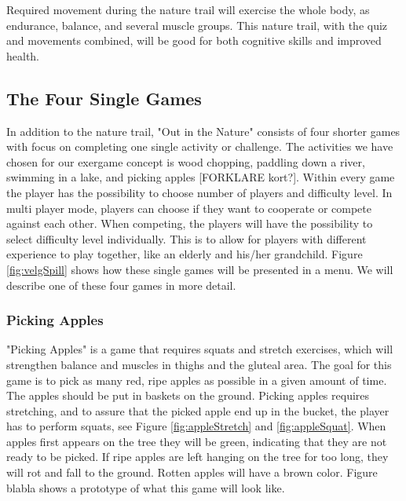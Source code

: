 Required movement during the nature trail will exercise the whole body, as endurance, balance, and several muscle groups. This nature trail, with the quiz and movements combined, will be good for both cognitive skills and improved health.       

\subsection{The Four Single Games}
In addition to the nature trail, "Out in the Nature" consists of four shorter games with focus on completing one single activity or challenge. The activities we have chosen for our exergame concept is wood chopping, paddling down a river, swimming in a lake, and picking apples [FORKLARE kort?]. Within every game the player has the possibility to choose number of players and difficulty level. In multi player mode, players can choose if they want to cooperate or compete against each other. When competing, the players will have the possibility to select difficulty level individually. This is to allow for players with different experience to play together, like an elderly and his/her grandchild. Figure \ref{fig:velgSpill} shows how these single games will be presented in a menu. We will describe one of these four games in more detail.

\subsubsection{Picking Apples}
"Picking Apples" is a game that requires squats and stretch exercises, which will strengthen balance and muscles in thighs and the gluteal area. The goal for this game is to pick as many red, ripe apples as possible in a given amount of time. The apples should be put in baskets on the ground. Picking apples requires stretching, and to assure that the picked apple end up in the bucket, the player has to perform squats, see Figure \ref{fig:appleStretch} and \ref{fig:appleSquat}. When apples first appears on the tree they will be green, indicating that they are not ready to be picked. If ripe apples are left hanging on the tree for too long, they will rot and fall to the ground. Rotten apples will have a brown color. Figure blabla shows a prototype of what this game will look like.  

